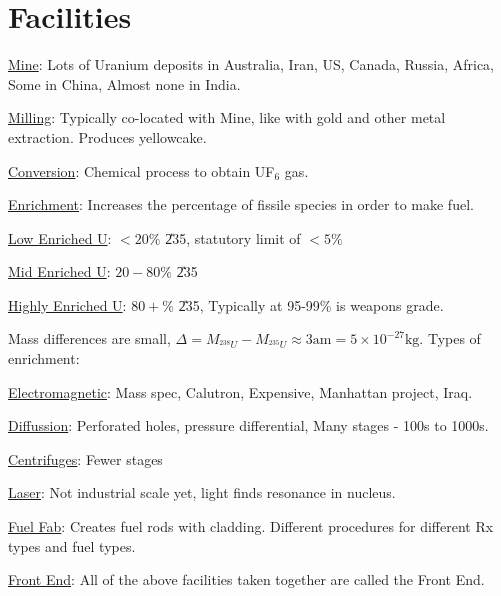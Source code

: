 \section{Facilities}
\begin{labeling}
    \item [\underline{Mine}:] Lots of Uranium deposits in Australia, Iran, US, Canada, Russia,
        Africa, Some in China, Almost none in India.
    \item [\underline{Milling}:] Typically co-located with Mine, like with gold and other
        metal  extraction. Produces yellowcake.
    \item [\underline{Conversion}:] Chemical process to obtain UF$_6$ gas.
    \item [\underline{Enrichment}:] Increases the percentage of fissile species in order to
        make fuel.
        \begin{labeling}
            \item [\underline{Low Enriched U}:] $<20\%$ \U235, statutory limit of $<5\%$
            \item [\underline{Mid Enriched U}:] $20 - 80\%$ \U235
            \item [\underline{Highly Enriched U}:] $80+\%$ \U235, Typically at 95-99\% is
                weapons grade.
        \end{labeling}
        Mass differences are small, $\Delta = M_{^{238}U} - M_{^{235}U} \approx 3 \mathrm{am} = 5\times 10^{-27} \mathrm{kg}$.
        Types of enrichment:
        \begin{labeling}
            \item [\underline{Electromagnetic}:] Mass spec, Calutron, Expensive, Manhattan project, Iraq.
            \item [\underline{Diffussion}:] Perforated holes, pressure differential, Many stages - 100s to 1000s.
            \item [\underline{Centrifuges}:] Fewer stages
            \item [\underline{Laser}:] Not industrial scale yet, light finds resonance in nucleus.
        \end{labeling}
    \item [\underline{Fuel Fab}:] Creates fuel rods with cladding. Different procedures for different Rx types
        and fuel types.
    \item [\underline{Front End}:] All of the above facilities taken together are called the Front End.

\end{labeling}
